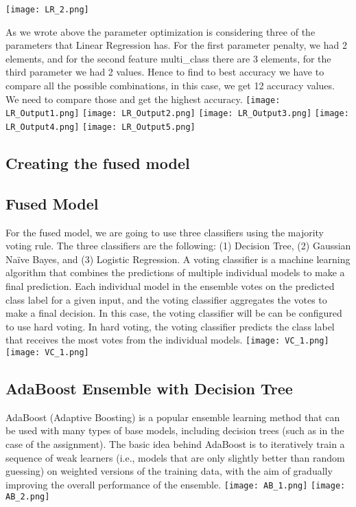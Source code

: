 \documentclass{article}
\begin{document}
 \texttt{[image: LR\_2.png]}

 \vspace{1cm}
As we wrote above the parameter optimization is considering three of the parameters that Linear Regression has. For the first parameter penalty, we had 2 elements, and for the second feature multi\_class there are 3 elements, for the third parameter we had 2 values. Hence to find to best accuracy we have to compare all the possible combinations, in this case, we get 12 accuracy values. We need to compare those and get the highest accuracy.
 \texttt{[image: LR\_Output1.png]}
 \texttt{[image: LR\_Output2.png]}
 \texttt{[image: LR\_Output3.png]}
 \texttt{[image: LR\_Output4.png]}
 \texttt{[image: LR\_Output5.png]}
 

\subsection{Creating the fused model}
\subsection{Fused Model}
For the fused model, we are going to use three classifiers using the majority voting rule. The three classifiers are the following:  (1) Decision Tree, (2) Gaussian Naïve Bayes, and (3) Logistic Regression. A voting classifier is a machine learning algorithm that combines the predictions of multiple individual models to make a final prediction. Each individual model in the ensemble votes on the predicted class label for a given input, and the voting classifier aggregates the votes to make a final decision. In this case, the voting classifier will be can be configured to use hard voting. In hard voting, the voting classifier predicts the class label that receives the most votes from the individual models. 
\texttt{[image: VC\_1.png]}
\texttt{[image: VC\_1.png]}


\subsection{AdaBoost Ensemble with Decision Tree}
AdaBoost (Adaptive Boosting) is a popular ensemble learning method that can be used with many types of base models, including decision trees (such as in the case of the assignment). The basic idea behind AdaBoost is to iteratively train a sequence of weak learners (i.e., models that are only slightly better than random guessing) on weighted versions of the training data, with the aim of gradually improving the overall performance of the ensemble.
\texttt{[image: AB\_1.png]}
\texttt{[image: AB\_2.png]}
\end{document}
